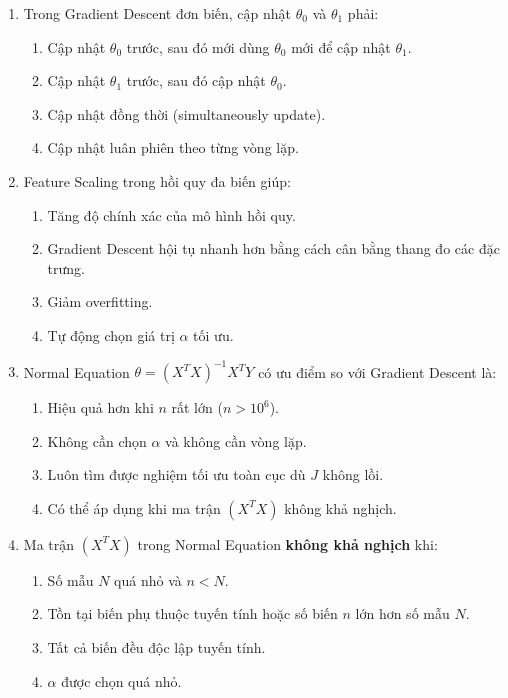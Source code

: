 \documentclass[10pt]{article}
\begin{document}
\begin{enumerate}[leftmargin=*, label=\textbf{Câu \arabic*.}]
    \item Trong Gradient Descent đơn biến, cập nhật $\theta_0$ và $\theta_1$ phải:
    \begin{enumerate}[label=\Alph*.]
        \item Cập nhật $\theta_0$ trước, sau đó mới dùng $\theta_0$ mới để cập nhật $\theta_1$.
        \item Cập nhật $\theta_1$ trước, sau đó cập nhật $\theta_0$.
        \item Cập nhật đồng thời (simultaneously update).
        \item Cập nhật luân phiên theo từng vòng lặp.
    \end{enumerate}

    \item Feature Scaling trong hồi quy đa biến giúp:
    \begin{enumerate}[label=\Alph*.]
        \item Tăng độ chính xác của mô hình hồi quy.
        \item Gradient Descent hội tụ nhanh hơn bằng cách cân bằng thang đo các đặc trưng.
        \item Giảm overfitting.
        \item Tự động chọn giá trị $\alpha$ tối ưu.
    \end{enumerate}

    \item Normal Equation $\theta = (X^TX)^{-1}X^TY$ có ưu điểm so với Gradient Descent là:
    \begin{enumerate}[label=\Alph*.]
        \item Hiệu quả hơn khi $n$ rất lớn ($n > 10^6$).
        \item Không cần chọn $\alpha$ và không cần vòng lặp.
        \item Luôn tìm được nghiệm tối ưu toàn cục dù $J$ không lồi.
        \item Có thể áp dụng khi ma trận $(X^TX)$ không khả nghịch.
    \end{enumerate}

    \item Ma trận $(X^TX)$ trong Normal Equation \textbf{không khả nghịch} khi:
    \begin{enumerate}[label=\Alph*.]
        \item Số mẫu $N$ quá nhỏ và $n < N$.
        \item Tồn tại biến phụ thuộc tuyến tính hoặc số biến $n$ lớn hơn số mẫu $N$.
        \item Tất cả biến đều độc lập tuyến tính.
        \item $\alpha$ được chọn quá nhỏ.
    \end{enumerate}


\end{enumerate}
\end{document}
